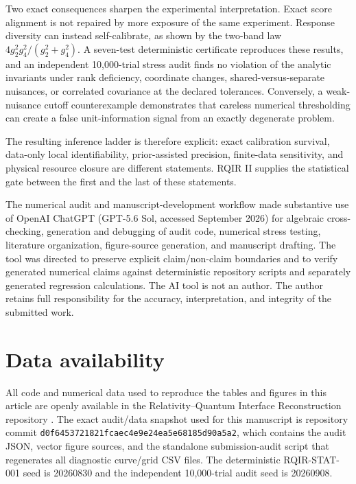 Two exact consequences sharpen the experimental interpretation. Exact score alignment is not repaired by more exposure of the same experiment. Response diversity can instead self-calibrate, as shown by the two-band law $4g_2^2g_4^2/(g_2^2+g_4^2)$. A seven-test deterministic certificate reproduces these results, and an independent 10,000-trial stress audit finds no violation of the analytic invariants under rank deficiency, coordinate changes, shared-versus-separate nuisances, or correlated covariance at the declared tolerances. Conversely, a weak-nuisance cutoff counterexample demonstrates that careless numerical thresholding can create a false unit-information signal from an exactly degenerate problem.

The resulting inference ladder is therefore explicit: exact calibration survival, data-only local identifiability, prior-assisted precision, finite-data sensitivity, and physical resource closure are different statements. RQIR II supplies the statistical gate between the first and the last of these statements.

\begin{acknowledgments}
The numerical audit and manuscript-development workflow made substantive use of OpenAI ChatGPT (GPT-5.6 Sol, accessed September 2026) for algebraic cross-checking, generation and debugging of audit code, numerical stress testing, literature organization, figure-source generation, and manuscript drafting. The tool was directed to preserve explicit claim/non-claim boundaries and to verify generated numerical claims against deterministic repository scripts and separately generated regression calculations. The AI tool is not an author. The author retains full responsibility for the accuracy, interpretation, and integrity of the submitted work.
\end{acknowledgments}

\section*{Data availability}
All code and numerical data used to reproduce the tables and figures in this article are openly available in the Relativity--Quantum Interface Reconstruction repository \cite{RQIRRepo}. The exact audit/data snapshot used for this manuscript is repository commit \texttt{d0f6453721821fcaec4e9e24ea5e68185d90a5a2}, which contains the audit JSON, vector figure sources, and the standalone submission-audit script that regenerates all diagnostic curve/grid CSV files. The deterministic RQIR-STAT-001 seed is 20260830 and the independent 10,000-trial audit seed is 20260908.

